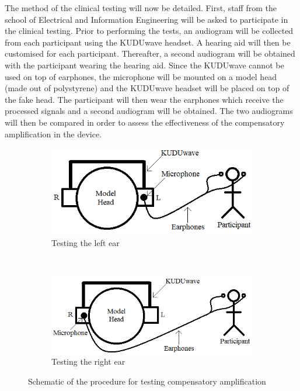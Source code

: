 \documentclass[10pt,twocolumn]{witseiepaper}
\begin{document}
The method of the clinical testing will now be detailed. First, staff from the school of Electrical and Information Engineering will be asked to participate in the clinical testing. Prior to performing the tests, an audiogram will be collected from each participant using the KUDUwave headset. A hearing aid will then be customised for each participant. Thereafter, a second audiogram will be obtained with the participant wearing the hearing aid. Since the KUDUwave cannot be used on top of earphones, the microphone will be mounted on a model head (made out of polystyrene) and the KUDUwave headset will be placed on top of the fake head. The participant will then wear the earphones which receive the processed signals and a second audiogram will be obtained. The two audiograms will then be compared in order to assess the effectiveness of the compensatory amplification in the device.

\begin{figure}[h]
	\centering
	\begin{subfigure}[t]{0.5\textwidth}
		\centering
		\includegraphics[width=0.8\columnwidth]{gainTestingLeft.png}
		\caption{Testing the left ear}
	\end{subfigure}%
	\\
	\begin{subfigure}[t]{0.5\textwidth}
		\centering
		\includegraphics[width=0.8\columnwidth]{gainTestingRight.png}
		\caption{Testing the right ear}
	\end{subfigure}
	\caption{Schematic of the procedure for testing compensatory amplification}
	\label{fig:testing}	
\end{figure}
\end{document}
